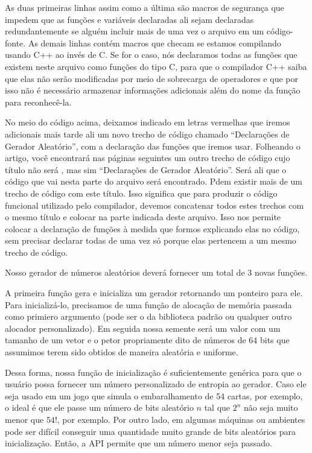 As duas primeiras linhas assim como a última são macros de segurança
que impedem que as funções e variáveis declaradas ali sejam declaradas
redundantemente se alguém incluir mais de uma vez o arquivo em um
código-fonte. As demais linhas contém macros que checam se estamos
compilando usando C++ ao invés de C. Se for o caso, nós declaramos
todas as funções que existem neste arquivo como funções do tipo C,
para que o compilador C++ saiba que elas não serão modificadas por
meio de sobrecarga de operadores e que por isso não é necessário
armazenar informações adicionais além do nome da função para
reconhecê-la.

No meio do código acima, deixamos indicado em letras vermelhas que
iremos adicionais mais tarde ali um novo trecho de código chamado
``Declarações de Gerador Aleatório'', com a declaração das funções que
iremos usar. Folheando o artigo, você encontrará nas páginas seguintes
um outro trecho de código cujo título não será ,
mas sim ``Declarações de Gerador Aleatório''. Será ali que o código que
vai nesta parte do arquivo será encontrado. Pdem existir mais de um
trecho de código com este título. Isso significa que para produzir o
código funcional utilizado pelo compilador, devemos concatenar todos
estes trechos com o mesmo título e colocar na parte indicada deste
arquivo. Isso nos permite colocar a declaração de funções à medida que
formos explicando elas no código, sem precisar declarar todas de uma
vez só porque elas pertencem a um mesmo trecho de código.


Nosso gerador de números aleatórios deverá fornecer um total de 3
novas funções.

A primeira função gera e inicializa um gerador retornando um ponteiro
para ele. Para inicializá-lo, precisamos de uma função de alocação de
memória passada como primiero argumento (pode ser o  da
biblioteca padrão ou qualquer outro alocador personalizado). Em
seguida nossa semente será um valor com um tamanho de um vetor e o
petor propriamente dito de números de 64 bits que assumimos terem sido
obtidos de maneira aleatória e uniforme.

Dessa forma, nossa função de inicialização é suficientemente genérica
para que o usuário possa fornecer um número personalizado de entropia
ao gerador. Caso ele seja usado em um jogo que simula o embaralhamento
de 54 cartas, por exemplo, o ideal é que ele passe um número de bits
aleatório $n$ tal que $2^n$ não seja muito menor que $54!$, por
exemplo. Por outro lado, em algumas máquinas ou ambientes pode ser
difícil conseguir uma quantidade muito grande de bits aleatórios para
inicialização. Então, a API permite que um número menor seja passado.

